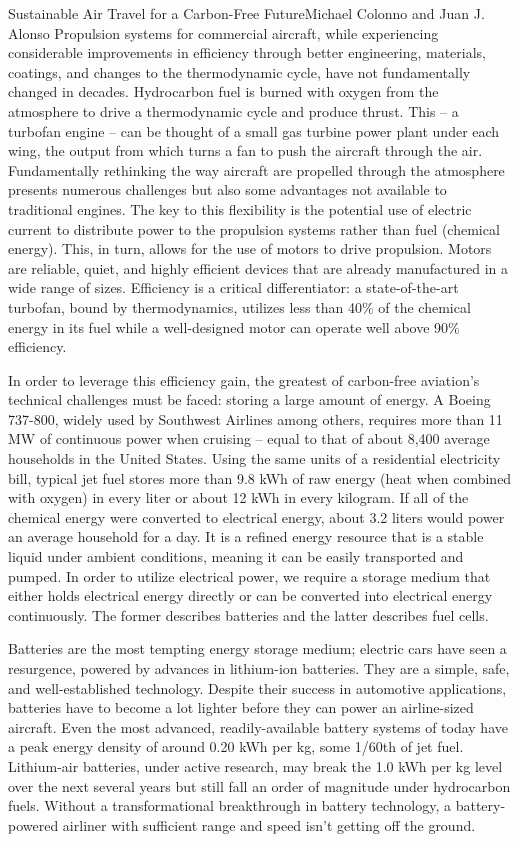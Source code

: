 \documentclass[10pt]{papertex}
\begin{document}
\begin{news}{2}{Sustainable Air Travel for a Carbon-Free Future}{Michael Colonno and Juan J. Alonso}{}{}
Propulsion systems for commercial aircraft, while experiencing considerable 
improvements in efficiency through better engineering, materials, coatings, 
and changes to the thermodynamic cycle, have not fundamentally changed in 
decades. Hydrocarbon fuel is burned with oxygen from the atmosphere to drive 
a thermodynamic cycle and produce thrust. This – a turbofan engine – can be 
thought of a small gas turbine power plant under each wing, the output from 
which turns a fan to push the aircraft through the air. Fundamentally 
rethinking the way aircraft are propelled through the atmosphere presents 
numerous challenges but also some advantages not available to traditional 
engines. The key to this flexibility is the potential use of electric current 
to distribute power to the propulsion systems rather than fuel (chemical 
energy). This, in turn, allows for the use of motors to drive propulsion. 
Motors are reliable, quiet, and highly efficient devices that are already 
manufactured in a wide range of sizes. Efficiency is a critical differentiator: 
a state-of-the-art turbofan, bound by thermodynamics, utilizes less than 40\% 
of the chemical energy in its fuel while a well-designed motor can operate 
well above 90\% efficiency.

In order to leverage this efficiency gain, the greatest of carbon-free 
aviation’s technical challenges must be faced: storing a large amount of 
energy. A Boeing 737-800, widely used by Southwest Airlines among others, 
requires more than 11 MW of continuous power when cruising – equal to that 
of about 8,400 average households in the United States. Using the same units 
of a residential electricity bill, typical jet fuel stores more than 9.8 kWh 
of raw energy (heat when combined with oxygen) in every liter or about 12 kWh 
in every kilogram. If all of the chemical energy were converted to electrical 
energy, about 3.2 liters would power an average household for a day. It is a 
refined energy resource that is a stable liquid under ambient conditions, 
meaning it can be easily transported and pumped. In order to utilize 
electrical power, we require a storage medium that either holds electrical 
energy directly or can be converted into electrical energy continuously. The 
former describes batteries and the latter describes fuel cells.

Batteries are the most tempting energy storage medium; electric cars have seen 
a resurgence, powered by advances in lithium-ion batteries. They are a simple, 
safe, and well-established technology. Despite their success in automotive 
applications, batteries have to become a lot lighter before they can power an 
airline-sized aircraft. Even the most advanced, readily-available battery 
systems of today have a peak energy density of around 0.20 kWh per kg, some 
1/60th of jet fuel. Lithium-air batteries, under active research, may break 
the 1.0 kWh per kg level over the next several years but still fall an order 
of magnitude under hydrocarbon fuels. Without a transformational breakthrough 
in battery technology, a battery-powered airliner with sufficient range and 
speed isn’t getting off the ground.


\end{news}
\end{document}

